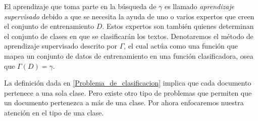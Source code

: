 \documentclass{llncs}
\begin{document}
	El aprendizaje que toma parte en la b\'usqueda de $\gamma$ es llamado \emph{aprendizaje supervisado} debido a que se necesita la ayuda de uno o varios expertos que creen el conjunto de entrenamiento $D$. Estos expertos son  tambi\'en quienes determinan el conjunto de clases en que se clasificar\'an los textos. Denotaremos el m\'etodo de aprendizaje supervisado descrito por $\Gamma$, el cual act\'ua como una funci\'on que mapea un conjunto de datos de entrenamiento en una funci\'on clasificadora, osea que $\Gamma(D) = \gamma$.
	
	La definici\'on dada en \ref{Problema_de_clasificacion} implica que cada documento pertenece a una sola clase. Pero existe otro tipo de problemas que permiten que un documento pertenezca a m\'as de una clase. Por ahora enfocaremos nuestra atenci\'on en el tipo de una clase.
	
\end{document}
